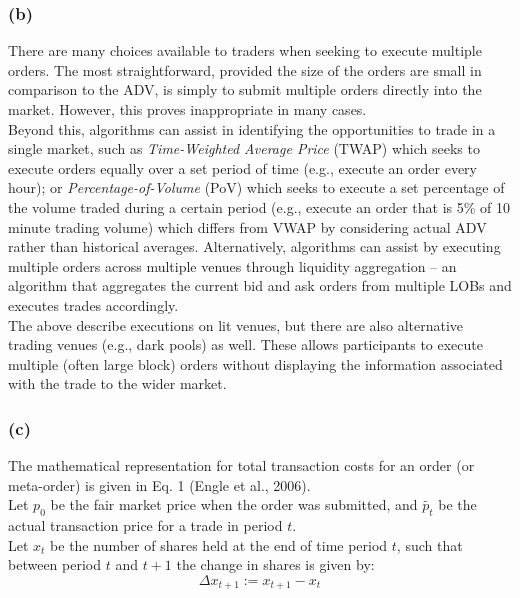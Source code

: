 \documentclass{article}
\begin{document}
\subsubsection*{(b)}
There are many choices available to traders when seeking to execute multiple orders. The most straightforward, provided the size of the orders are small in comparison to the ADV, is simply to submit multiple orders directly into the market. However, this proves inappropriate in many cases. \\

Beyond this, algorithms can assist in identifying the opportunities to trade in a single market, such as \textit{Time-Weighted Average Price} (TWAP) which seeks to execute orders equally over a set period of time (e.g., execute an order every hour); or \textit{Percentage-of-Volume} (PoV) which seeks to execute a set percentage of the volume traded during a certain period (e.g., execute an order that is 5\% of 10 minute trading volume) which differs from VWAP by considering actual ADV rather than historical averages. Alternatively, algorithms can assist by executing multiple orders across multiple venues through liquidity aggregation – an algorithm that aggregates the current bid and ask orders from multiple LOBs and executes trades accordingly. \\

The above describe executions on lit venues, but there are also alternative trading venues (e.g., dark pools) as well. These allows participants to execute multiple (often large block) orders without displaying the information associated with the trade to the wider market. \\


\subsubsection*{(c)}
The mathematical representation for total transaction costs for an order (or meta-order) is given in Eq. 1 (Engle et al., 2006). \\

Let $p_0$ be the fair market price when the order was submitted, and $\tilde{p_t}$ be the actual transaction price for a trade in period $t$. \\
Let $x_t$ be the number of shares held at the end of time period $t$, such that between  period $t$ and $t+1$ the change in shares is given by:\\
\begin{equation}
    \Delta x_{t+1} := x_{t+1} - x_t
\end{equation}
\end{document}
